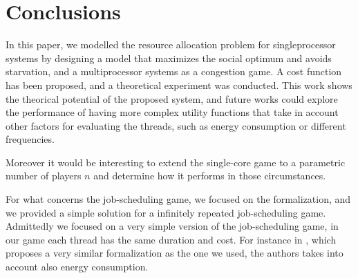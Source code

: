 \section{Conclusions}

In this paper, we modelled the resource allocation problem for singleprocessor
systems by designing a model that maximizes the social optimum and avoids
starvation, and a multiprocessor systems as a congestion game. A cost function 
has been proposed, and a theoretical experiment was conducted. This work shows
the theorical potential of the proposed system, and future works could explore
the performance of having more complex utility functions that take in account
other factors for evaluating the threads, such as energy consumption or
different frequencies.

Moreover it would be interesting to extend the single-core game to a
parametric number of players $n$ and determine how it performs in those
circumstances.

For what concerns the job-scheduling game, we focused on the formalization, and
we provided a simple solution for a infinitely repeated job-scheduling game.
Admittedly we focused on a very simple version of the job-scheduling game,
in our game each thread has the same duration and cost.
For instance in \cite{9244046}, which proposes a very similar formalization as the
one we used, the authors takes into account also energy consumption.